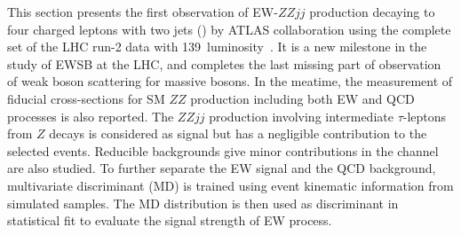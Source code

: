 This section presents the first observation of EW-$ZZjj$ production decaying to four charged leptons with two jets (\lllljj) by ATLAS collaboration using the complete set of the LHC run-2 data with 139~\ifb luminosity~\cite{Aad:2020zbq,Zhu:2714092}.
It is a new milestone in the study of EWSB at the LHC, and completes the last missing part of observation of weak boson scattering for massive bosons.
In the meatime, the measurement of fiducial cross-sections for SM $ZZ$ production including both EW and QCD processes is also reported.
The $ZZjj$ production involving intermediate $\tau$-leptons from $Z$ decays is considered as signal but has a negligible contribution to the selected events.
Reducible backgrounds give minor contributions in the \lllljj channel are also studied.
To further separate the EW signal and the QCD background, multivariate discriminant (MD) is trained using event kinematic information from simulated samples. 
The MD distribution is then used as discriminant in statistical fit to evaluate the signal strength of EW process.
